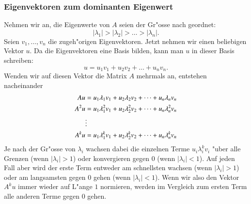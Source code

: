\subsubsection{Eigenvektoren zum dominanten Eigenwert\label{section:dominant}}
Nehmen wir an, die Eigenwerte von $A$
seien der Gr"osse nach geordnet:
\[
|\lambda_1| > |\lambda_2| > \dots > |\lambda_n|.
\]
Seien $v_1,\dots,v_n$ die zugeh"origen Eigenvektoren.
Jetzt nehmen wir einen beliebigen Vektor $u$.
Da die Eigenvektoren eine Basis bilden,
kann man $u$ in dieser Basis schreiben:
\[
u=u_1v_1+u_2v_2+\dots+u_nv_n.
\]
Wenden wir auf diesen Vektor die Matrix $A$ mehrmals an, entstehen
nacheinander
\begin{align}
Au&=
u_1\lambda_1v_1+u_2\lambda_2v_2+\dots+u_n\lambda_nv_n
\notag
\\
A^2u&=
u_1\lambda_1^2v_1+u_2\lambda_2^2v_2+\dots+u_n\lambda_n^2v_n
\notag
\\
&\vdots
\\
A^ku&=
u_1\lambda_1^kv_1+u_2\lambda_2^kv_2+\dots+u_n\lambda_n^kv_n
\label{power-method-vectors}
\end{align}
Je nach der Gr"osse von $\lambda_i$ wachsen dabei die einzelnen
Terme $u_i\lambda_i^kv_i$ "uber alle Grenzen (wenn $|\lambda_i|>1$)
oder konvergieren gegen $0$ (wenn $|\lambda_i|<1$).
Auf jeden Fall
aber wird der erste Term entweder am schnellsten wachsen (wenn $|\lambda_i|>1$)
oder am langsamsten gegen $0$ gehen (wenn $|\lambda_i|<1$).
Wenn wir also den Vektor $A^ku$ immer wieder auf L"ange $1$ normieren, 
werden im Vergleich zum ersten Term alle anderen Terme gegen $0$ gehen.

